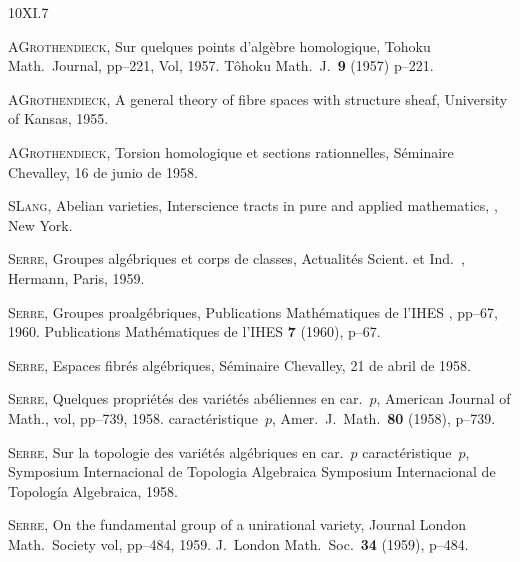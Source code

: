 
\begin{sgabibliography}{10}{XI.7}

 A\ptbl \textsc{Grothendieck},
Sur quelques points d'algèbre homologique,
{Tohoku Math.\ Journal, pp--221, Vol, 1957.}
{T\^ohoku Math.~J.\ \textbf{9} (1957) p--221.}

 A\ptbl \textsc{Grothendieck}, A general theory of fibre spaces with
structure sheaf, University of Kansas, 1955.

 A\ptbl \textsc{Grothendieck}, Torsion homologique et sections
rationnelles, Séminaire \hbox{Chevalley}, 16 de junio de 1958.

 S\ptbl \textsc{Lang}, Abelian varieties, Interscience tracts in pure
and applied mathematics, , New York.

%
\textsc{Serre}, Groupes algébriques et corps de classes,
Actualités Scient. et Ind.\ , Hermann, Paris, 1959.

%
\textsc{Serre}, Groupes proalgébriques,
{Publications Mathématiques de l'IHES , pp--67, 1960.}
{Publications Mathématiques de l'IHES \textbf{7} (1960), p--67.}

%
\textsc{Serre}, Espaces fibrés algébriques,
Séminaire Chevalley, 21 de abril de 1958.

%
\textsc{Serre}, Quelques propriétés des
variétés abéliennes en
{car.~$p$, American Journal of Math., vol, pp--739, 1958.}
{caractéristique~$p$, Amer.\ J.\ Math.\ \textbf{80} (1958), p--739.}

%
\textsc{Serre}, Sur la topologie des variétés
algébriques en
{car.~$p$}
{caractéristique~$p$},
{Symposium Internacional de Topologia Algebraica}
{Symposium Internacional de Topología Algebraica},
1958.

%
\textsc{Serre}, On the fundamental group of a unirational
variety,
{Journal London Math.\ Society vol, pp--484, 1959.}
{J.~London Math.\ Soc.\ \textbf{34} (1959), p--484.}
\end{sgabibliography}
